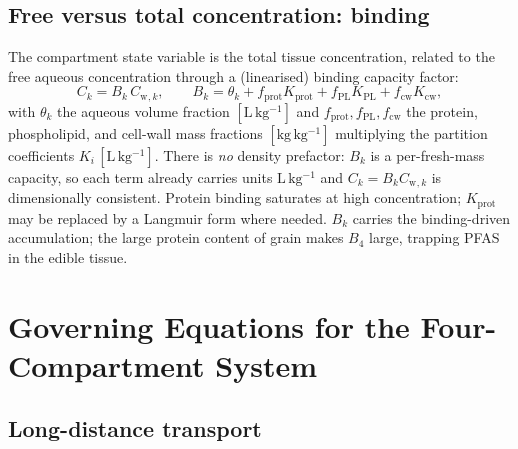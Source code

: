 \documentclass[12pt,a4paper]{article}
\newcommand{\Cw}{C_{\mathrm{w}}}
\begin{document}
\subsection{Free versus total concentration: binding}\label{sec:binding}

The compartment state variable is the total tissue concentration, related to the free aqueous concentration through a (linearised) binding capacity factor:
\begin{equation}\label{eq:binding}
    C_k=B_k\,\Cw{}_{,k},\qquad
    B_k=\theta_k+f_\mathrm{prot}K_\mathrm{prot}+f_\mathrm{PL}K_\mathrm{PL}+f_\mathrm{cw}K_\mathrm{cw},
\end{equation}
with $\theta_k$ the aqueous volume fraction $[\mathrm{L\,kg^{-1}}]$ and $f_\mathrm{prot},f_\mathrm{PL},f_\mathrm{cw}$ the protein, phospholipid, and cell-wall mass fractions $[\mathrm{kg\,kg^{-1}}]$ multiplying the partition coefficients $K_i\,[\mathrm{L\,kg^{-1}}]$.  There is \emph{no} density prefactor: $B_k$ is a per-fresh-mass capacity, so each term already carries units $\mathrm{L\,kg^{-1}}$ and $C_k=B_k\Cw{}_{,k}$ is dimensionally consistent.  Protein binding saturates at high concentration; $K_\mathrm{prot}$ may be replaced by a Langmuir form where needed.  $B_k$ carries the binding-driven accumulation; the large protein content of grain makes $B_4$ large, trapping PFAS in the edible tissue.


\section{Governing Equations for the Four-Compartment System}\label{sec:system}

\subsection{Long-distance transport}
\end{document}
